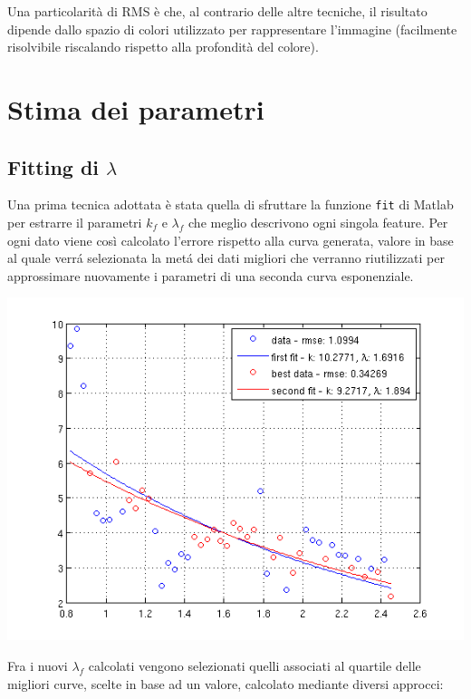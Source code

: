 \documentclass[12pt]{report}
\begin{document}
\noindent Una particolarit\`a di RMS \`e che, al contrario delle altre tecniche, il risultato dipende dallo spazio di colori utilizzato per rappresentare l'immagine (facilmente risolvibile riscalando rispetto alla profondit\`a del colore).

\section{Stima dei parametri}

\subsection{Fitting di $\lambda$}

\noindent Una prima tecnica adottata \`e stata quella di sfruttare la funzione \verb|fit| di Matlab per estrarre il parametri $k_f$ e $\lambda_f$ che meglio descrivono ogni singola feature. Per ogni dato viene cos\`i calcolato l'errore rispetto alla curva generata, valore in base al quale verr\'a selezionata la met\'a dei dati migliori che verranno riutilizzati per approssimare nuovamente i parametri di una seconda curva esponenziale.\\

\begin{center}
	\includegraphics[scale=0.75]{images/twoFits.png}
	\label{fig:twoFits}
\end{center}

\noindent Fra i nuovi $\lambda_f$ calcolati vengono selezionati quelli associati al quartile delle migliori curve, scelte in base ad un valore, calcolato mediante diversi approcci:
\end{document}
